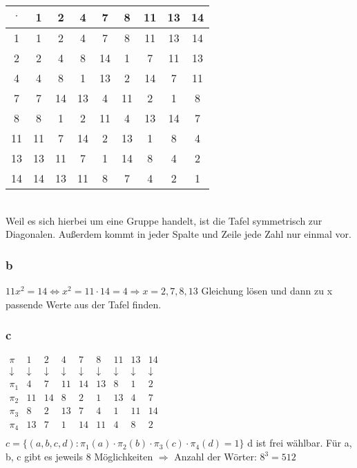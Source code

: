 \begin{tabular}{|c|c|c|c|c|c|c|c|c|}
\hline $\cdot$ & 1 & 2 & 4 & 7 & 8 & 11 & 13 & 14 \\ 
\hline 1 & 1 & 2 & 4 & 7 & 8 & 11 & 13 & 14 \\ 
\hline 2 & 2 & 4 & 8 & 14 & 1 & 7 & 11 & 13 \\ 
\hline 4 & 4 & 8 & 1 & 13 & 2 & 14 & 7 & 11 \\ 
\hline 7 & 7 & 14 & 13 & 4 & 11 & 2 & 1 & 8 \\ 
\hline 8 & 8 & 1 & 2 & 11 & 4 & 13 & 14 & 7 \\ 
\hline 11 & 11 & 7 & 14 & 2 & 13 & 1 & 8 & 4 \\ 
\hline 13 & 13 & 11 & 7 & 1 & 14 & 8 & 4 & 2 \\ 
\hline 14 & 14 & 13 & 11 & 8 & 7 & 4 & 2 & 1 \\ 
\hline 
\end{tabular} \\
Weil es sich hierbei um eine Gruppe handelt, ist die Tafel symmetrisch zur Diagonalen. Außerdem kommt in jeder Spalte und Zeile jede Zahl nur einmal vor. 

\subsubsection{b}
$11 x^2=14 \Leftrightarrow x^2=11\cdot 14=4 \Rightarrow x=2,7,8,13$
Gleichung lösen und dann zu x passende Werte aus der Tafel finden. 

\subsubsection{c}
$
\begin{array}{ccccccccc}
\pi & 1 & 2 & 4 & 7 & 8 & 11 & 13 & 14 \\ 
\downarrow & \downarrow & \downarrow & \downarrow & \downarrow & \downarrow & \downarrow & \downarrow & \downarrow \\ 
\pi_{1} & 4 & 7 & 11 & 14 & 13 & 8 & 1 & 2 \\
\pi_{2} & 11 & 14 & 8 & 2 & 1 & 13 & 4 & 7 \\
\pi_{3} & 8 & 2 & 13 & 7 & 4 & 1 & 11 & 14 \\
\pi_{4} & 13 & 7 & 1 & 14 & 11 & 4 & 8 & 2 \\
\end{array}
$\\
$c = \{(a,b,c,d) : \pi_{1}(a) \cdot  \pi_{2}(b) \cdot  \pi_{3}(c) \cdot  \pi_{4}(d) = 1 \}$
d ist frei wählbar. Für a, b, c gibt es jeweils 8 Möglichkeiten $\Rightarrow$ Anzahl der Wörter: $8^3=512$

